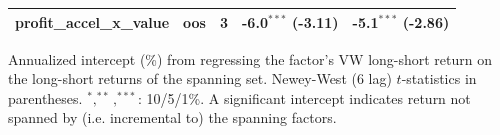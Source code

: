\begin{table}[htbp]
\begin{threeparttable}
\begin{tabular}{llccc}
profit\_accel\_x\_value & oos & 3 & -6.0$^{***}$ (-3.11) & -5.1$^{***}$ (-2.86) \\
\bottomrule
\end{tabular}
\begin{tablenotes}\footnotesize
\item Annualized intercept (\%) from regressing the factor's VW long-short return on the long-short returns of the spanning set. Newey-West (6 lag) $t$-statistics in parentheses. $^{*},^{**},^{***}$: 10/5/1\%. A significant intercept indicates return not spanned by (i.e. incremental to) the spanning factors.
\end{tablenotes}
\end{threeparttable}
\end{table}